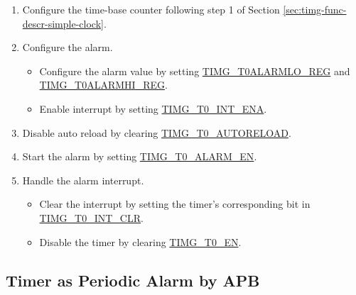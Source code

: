 \documentclass[main\_\_EN.tex]{subfiles}
\begin{document}
\begin{enumerate}
    \item Configure the time-base counter following step 1 of Section \ref{sec:timg-func-descr-simple-clock}.
    \item Configure the alarm.
    \begin{itemize}
        \item Configure the alarm value by setting \hyperref[regdesc:TIMGTXALARMLOREG]{TIMG\_T0ALARMLO\_REG} and \hyperref[regdesc:TIMGTXALARMHIREG]{TIMG\_T0ALARMHI\_REG}.
        \item Enable interrupt by setting  \hyperref[fielddesc:TIMGT0INTENA]{TIMG\_T0\_INT\_ENA}.
    \end{itemize}
    \item Disable auto reload by clearing \hyperref[fielddesc:TIMGTXAUTORELOAD]{TIMG\_T0\_AUTORELOAD}.
    \item Start the alarm by setting \hyperref[fielddesc:TIMGTXALARMEN]{TIMG\_T0\_ALARM\_EN}.
    \item Handle the alarm interrupt.
    \begin{itemize}
        \item Clear the interrupt by setting the timer's corresponding bit in \hyperref[fielddesc:TIMGT0INTCLR]{TIMG\_T0\_INT\_CLR}.
        \item Disable the timer by clearing \hyperref[fielddesc:TIMGTXEN]{TIMG\_T0\_EN}.
    \end{itemize}
\end{enumerate}

\subsection{Timer as Periodic Alarm by APB}
\end{document}
